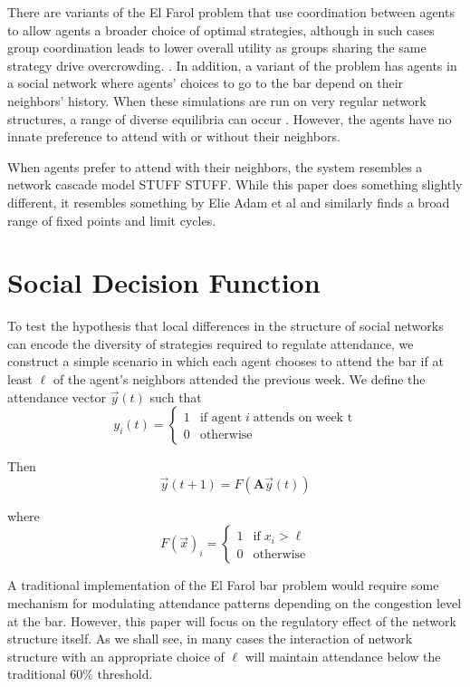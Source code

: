 \documentclass[12pt]{article}
\begin{document}
There are variants of the El Farol problem that use coordination between agents to allow agents a broader choice of optimal strategies, although in such cases group coordination leads to lower overall utility as groups sharing the same strategy drive overcrowding. \cite{collins:2017} \cite{wilensky:2015}.  In addition, a variant of the problem has agents in a social network where agents' choices to go to the bar depend on their neighbors' history.   When these simulations are run on very regular network structures, a range of diverse equilibria can occur \cite{chen:2012}.  However, the agents have no innate preference to attend with or without their neighbors.

When agents prefer to attend with their neighbors, the system resembles a network cascade model STUFF STUFF.  While this paper does something slightly different, it resembles something by Elie Adam et al \cite{adam:2012} and similarly finds a broad range of fixed points and limit cycles.

\section{Social Decision Function}
To test the hypothesis that local differences in the structure of social networks can encode the diversity of strategies required to regulate attendance, we construct a simple scenario in which each agent chooses to attend the bar if at least $\ell$ of the agent's neighbors attended the previous week.  We define the attendance vector $\vec{y}(t)$ such that
\begin{equation}
  y_i(t) = \begin{cases}
    1 &\text{if agent}\; i \; \text{attends on week t} \\
    0 &\text{otherwise}
  \end{cases}
\end{equation}

Then 
\begin{equation}
  \vec{y}(t + 1) = F(\mathbf{A}\vec{y}(t))
\end{equation}

where
\begin{equation}
  F(\vec{x})_i = \begin{cases}
    1 &\text{if} \; x_i > \ell \\
    0 &\text{otherwise}
  \end{cases}
\end{equation}

A traditional implementation of the El Farol bar problem would require some mechanism for modulating attendance patterns depending on the congestion level at the bar.  However, this paper will focus on the regulatory effect of the network structure itself.  As we shall see, in many cases the interaction of network structure with an appropriate choice of $\ell$ will maintain attendance below the traditional 60\% threshold. 
\end{document}
